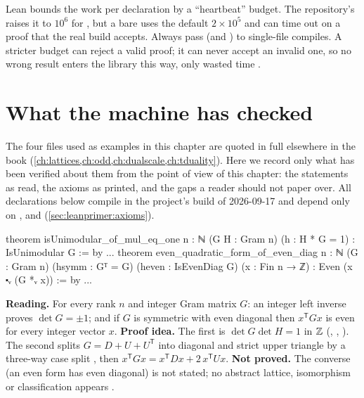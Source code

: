\begin{pitfallbox}
Lean bounds the work per declaration by a ``heartbeat'' budget. The repository's
 raises it to $10^6$ for , but a bare
 uses the default $2\times10^5$ and can time out on a proof
that the real build accepts. Always pass  (and
) to single-file compiles. A stricter budget can reject a valid
proof; it can never accept an invalid one, so no wrong result enters the library this way,
only wasted time .
\end{pitfallbox}

\section{What the machine has checked}\label{sec:leanprimer:lean}

The four files used as examples in this chapter are quoted in full elsewhere in the book
(\cref{ch:lattices,ch:odd,ch:dualscale,ch:tduality}). Here we record only what has been
verified about them from the point of view of this chapter: the statements as read, the
axioms as printed, and the gaps a reader should not paper over. All declarations below
compile in the project's build of 2026-09-17 and depend only on ,
 and  (\cref{sec:leanprimer:axioms}).

\begin{leanbox}
\begin{leancode}
theorem isUnimodular_of_mul_eq_one {n : ℕ} (G H : Gram n) (h : H * G = 1) :
    IsUnimodular G := by ...
theorem even_quadratic_form_of_even_diag {n : ℕ} (G : Gram n) (hsymm : Gᵀ = G)
    (heven : IsEvenDiag G) (x : Fin n → ℤ) : Even (x ⬝ᵥ (G *ᵥ x)) := by ...
\end{leancode}
\textbf{Reading.} For every rank $n$ and integer Gram matrix $G$: an integer left inverse
proves $\det G=\pm1$; and if $G$ is symmetric with even diagonal then $x^{\mathsf T}Gx$ is
even for every integer vector $x$. \textbf{Proof idea.} The first is
$\det G\det H=1$ in $\mathbb{Z}$ (, ,
). The second splits
$G=D+U+U^{\mathsf T}$ into diagonal and strict upper triangle by a three-way case split
, then $x^{\mathsf T}Gx = x^{\mathsf T}Dx + 2\,x^{\mathsf T}Ux$.
\textbf{Not proved.} The converse (an even form has even diagonal) is not stated; no
abstract lattice, isomorphism or classification appears
. \TA
\end{leanbox}

